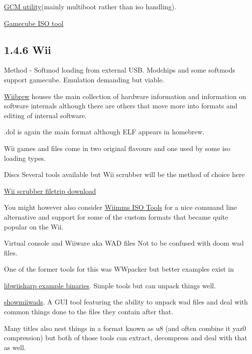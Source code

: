 \documentclass[
]{book}
\begin{document}
\href{http://filetrip.net/wii-downloads/other-files/download-gcmutility-05-f606.html}{GCM utility}(mainly multiboot rather than iso handling).

\href{http://filetrip.net/wii-downloads/tools-utilities/latest-gamecube-iso-tool-f28774.html}{Gamecube ISO tool}

\hypertarget{wii}{%
\subsection{1.4.6 Wii}\label{wii}}

Method - Softmod loading from external USB. Modchips and some softmods support gamecube. Emulation demanding but viable.

\href{http://wiibrew.org/wiki/Wii_Hardware}{Wiibrew} houses the main collection of hardware information and information on software internals although there are others that move more into formats and editing of internal software.

.dol is again the main format although ELF appears in homebrew.

Wii games and files come in two original flavours and one used by some iso loading types.

Discs Several tools available but Wii scrubber will be the method of choice here

\href{http://filetrip.net/wii-downloads/other-files/download-wiiscrubber-kit-with-multiloader-140-f4399.html}{Wii scrubber filetrip download}

You might however also consider \href{http://wit.wiimm.de/}{Wiimms ISO Tools} for a nice command line alternative and support for some of the custom formats that became quite popular on the Wii.

Virtual console and Wiiware aka WAD files Not to be confused with doom wad files.

One of the former tools for this was WWpacker but better examples exist in

\href{https://code.google.com/p/libwiisharp/}{libwiisharp example binaries}. Simple tools but can unpack things well.

\href{http://code.google.com/p/showmiiwads/}{showmiiwads}. A GUI tool featuring the ability to unpack wad files and deal with common things done to the files they contain after that.

Many titles also nest things in a format known as u8 (and often combine it yaz0 compression) but both of those tools can extract, decompress and deal with that as well.
\end{document}

